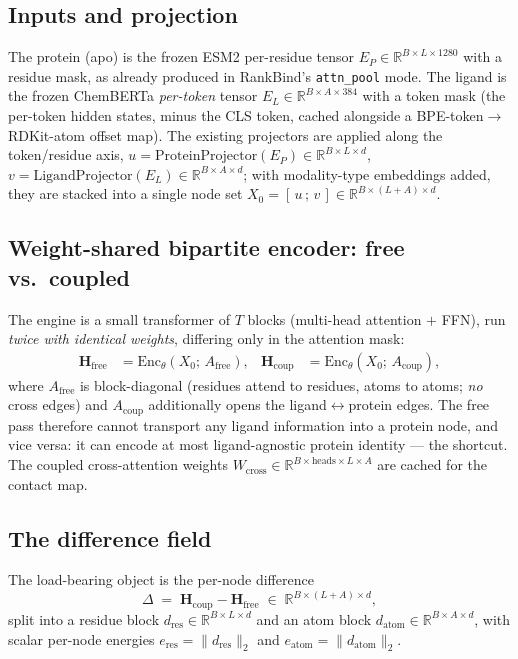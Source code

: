 \documentclass[11pt,a4paper]{article}
\newcommand{\method}{RankBind\xspace}
\newcommand{\Hfree}{\mathbf{H}_{\text{free}}}
\newcommand{\Hcoup}{\mathbf{H}_{\text{coup}}}
\begin{document}
\subsection{Inputs and projection}
The protein (apo) is the frozen ESM2 per-residue tensor
$E_P\in\mathbb{R}^{B\times L\times1280}$ with a residue mask, as already
produced in \method's \texttt{attn\_pool} mode. The ligand is the frozen
ChemBERTa \emph{per-token} tensor $E_L\in\mathbb{R}^{B\times A\times384}$ with
a token mask (the per-token hidden states, minus the CLS token, cached
alongside a BPE-token$\to$RDKit-atom offset map). The existing projectors are
applied along the token/residue axis,
$u=\mathrm{ProteinProjector}(E_P)\in\mathbb{R}^{B\times L\times d}$,
$v=\mathrm{LigandProjector}(E_L)\in\mathbb{R}^{B\times A\times d}$; with
modality-type embeddings added, they are stacked into a single node set
$X_0=[\,u\,;\,v\,]\in\mathbb{R}^{B\times(L+A)\times d}$.

\subsection{Weight-shared bipartite encoder: free vs.\ coupled}
The engine is a small transformer of $T$ blocks (multi-head attention $+$
FFN), run \emph{twice with identical weights}, differing only in the
attention mask:
\begin{align}
\Hfree &= \mathrm{Enc}_\theta(X_0;\, A_{\text{free}}), &
\Hcoup &= \mathrm{Enc}_\theta(X_0;\, A_{\text{coup}}),
\end{align}
where $A_{\text{free}}$ is block-diagonal (residues attend to residues, atoms
to atoms; \emph{no} cross edges) and $A_{\text{coup}}$ additionally opens the
ligand$\leftrightarrow$protein edges. The free pass therefore cannot transport
any ligand information into a protein node, and vice versa: it can encode at
most ligand-agnostic protein identity --- the shortcut. The coupled
cross-attention weights $W_{\text{cross}}\in\mathbb{R}^{B\times \text{heads}
\times L\times A}$ are cached for the contact map.

\subsection{The difference field}
The load-bearing object is the per-node difference
\begin{equation}
\Delta \;=\; \Hcoup - \Hfree \;\in\; \mathbb{R}^{B\times(L+A)\times d},
\end{equation}
split into a residue block $d_{\text{res}}\in\mathbb{R}^{B\times L\times d}$
and an atom block $d_{\text{atom}}\in\mathbb{R}^{B\times A\times d}$, with
scalar per-node energies
$e_{\text{res}}=\lVert d_{\text{res}}\rVert_2$ and
$e_{\text{atom}}=\lVert d_{\text{atom}}\rVert_2$.
\end{document}
